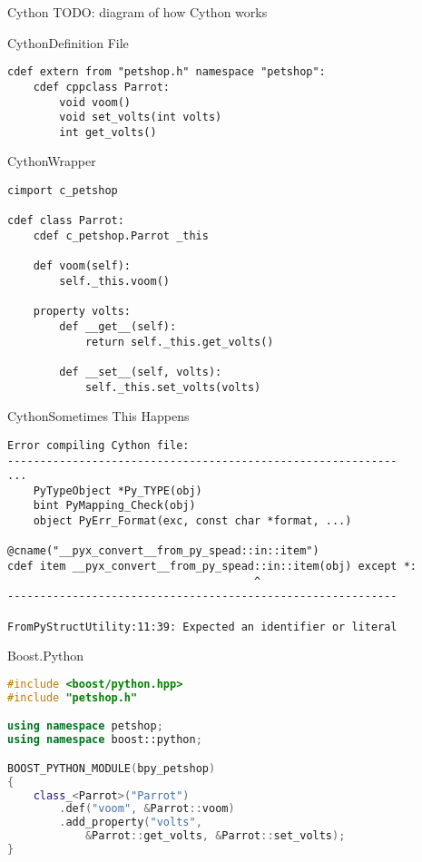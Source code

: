 \documentclass{beamer}
\begin{document}
\begin{frame}{Cython}
  TODO: diagram of how Cython works
\end{frame}

\begin{frame}[fragile=singleslide]{Cython}{Definition File}
  \begin{lstlisting}[language=cython]
cdef extern from "petshop.h" namespace "petshop":
    cdef cppclass Parrot:
        void voom()
        void set_volts(int volts)
        int get_volts()
  \end{lstlisting}
\end{frame}

\begin{frame}[fragile=singleslide]{Cython}{Wrapper}
  \begin{lstlisting}[language=cython]
cimport c_petshop

cdef class Parrot:
    cdef c_petshop.Parrot _this

    def voom(self):
        self._this.voom()

    property volts:
        def __get__(self):
            return self._this.get_volts()

        def __set__(self, volts):
            self._this.set_volts(volts)
  \end{lstlisting}
\end{frame}

\begin{frame}[fragile=singleslide]{Cython}{Sometimes This Happens}
  \footnotesize
  \begin{verbatim}
Error compiling Cython file:
------------------------------------------------------------
...
    PyTypeObject *Py_TYPE(obj)
    bint PyMapping_Check(obj)
    object PyErr_Format(exc, const char *format, ...)

@cname("__pyx_convert__from_py_spead::in::item")
cdef item __pyx_convert__from_py_spead::in::item(obj) except *:
                                      ^
------------------------------------------------------------

FromPyStructUtility:11:39: Expected an identifier or literal
  \end{verbatim}
\end{frame}

\begin{frame}[fragile=singleslide]{Boost.Python}
  \begin{lstlisting}[language=c++]
#include <boost/python.hpp>
#include "petshop.h"

using namespace petshop;
using namespace boost::python;

BOOST_PYTHON_MODULE(bpy_petshop)
{
    class_<Parrot>("Parrot")
        .def("voom", &Parrot::voom)
        .add_property("volts",
            &Parrot::get_volts, &Parrot::set_volts);
}
  \end{lstlisting}
\end{frame}
\end{document}
